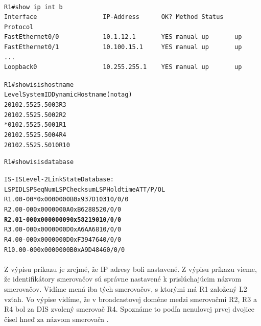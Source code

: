 \documentclass[12pt,twoside,a4paper]{report}
\begin{document}
\noindent
{\selectfont
\begin{small}
\begin{verbatim}

R1#show ip int b
Interface                  IP-Address      OK? Method Status   Protocol
FastEthernet0/0            10.1.12.1       YES manual up       up      
FastEthernet0/1            10.100.15.1     YES manual up       up      
...    
Loopback0                  10.255.255.1    YES manual up       up  

\end{verbatim}
\end{small}
}

\noindent
{\selectfont
\begin{small}
\begin{alltt}

R1#show isis hostname
Level  System ID      Dynamic Hostname  (notag)
 2     0102.5525.5003 R3
 2     0102.5525.5002 R2
     * 0102.5525.5001 R1
 2     0102.5525.5004 R4
 2     0102.5525.5010 R10

\end{alltt}
\end{small}
}

\noindent
{\selectfont
\begin{small}
\begin{alltt}
R1#show isis database

IS-IS Level-2 Link State Database:
LSPID                 LSP Seq Num  LSP Checksum  LSP Holdtime      ATT/P/OL
R1.00-00            * 0x0000000B   0x937D        1031              0/0/0
R2.00-00              0x0000000A   0xB628        852               0/0/0
\textbf{R2.01-00              0x00000009   0x5821        901               0/0/0}
R3.00-00              0x0000000D   0xA6AA        681               0/0/0
R4.00-00              0x0000000D   0xF394        764               0/0/0
R10.00-00             0x0000000B   0xA9D4        846               0/0/0
\end{alltt}
\end{small}
}

\paragraph{}
Z výpisu príkazu  je zrejmé, že IP adresy boli nastavené. Z výpisu príkazu  vieme, že identifikátory smerovačov sú správne nastavené k prislúchajúcim názvom smerovačov. Vidíme mená iba tých smerovačov, s ktorými má R1 založený L2 vzťah. Vo výpise  vidíme, že v broadcastovej doméne medzi smerovačmi R2, R3 a R4 bol za DIS zvolený smerovač R4. Spoznáme to podľa nenulovej prvej dvojice čísel hneď za názvom smerovača .
\end{document}
